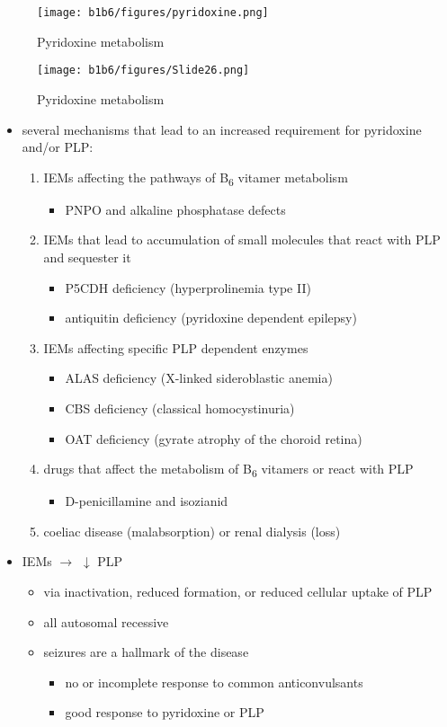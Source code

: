 \documentclass[12pt]{scrartcl}
\begin{document}
\begin{figure}[htbp]
\centering
\texttt{[image: b1b6/figures/pyridoxine.png]}
\caption{\label{fig:orgb8f4f33}Pyridoxine metabolism}
\end{figure}

\begin{figure}[htbp]
\centering
\texttt{[image: b1b6/figures/Slide26.png]}
\caption{\label{fig:org6278830}Pyridoxine metabolism}
\end{figure}

\begin{itemize}
\item several mechanisms that lead to an increased requirement for
pyridoxine and/or PLP:
\begin{enumerate}
\item IEMs affecting the pathways of B\textsubscript{6} vitamer metabolism
\begin{itemize}
\item PNPO and alkaline phosphatase defects
\end{itemize}
\item IEMs that lead to accumulation of small molecules that
react with PLP and sequester it
\begin{itemize}
\item P5CDH deficiency (hyperprolinemia type II)
\item antiquitin deficiency (pyridoxine dependent epilepsy)
\end{itemize}
\item IEMs affecting specific PLP dependent enzymes
\begin{itemize}
\item ALAS deficiency (X-linked sideroblastic anemia)
\item CBS deficiency (classical homocystinuria)
\item OAT deficiency (gyrate atrophy of the choroid retina)
\end{itemize}
\item drugs that affect the metabolism of B\textsubscript{6} vitamers or react with PLP
\begin{itemize}
\item D-penicillamine and isozianid
\end{itemize}
\item coeliac disease (malabsorption) or renal dialysis (loss)
\end{enumerate}
\item IEMs \(\to\) \(\downarrow\) PLP
\begin{itemize}
\item via inactivation, reduced formation, or reduced cellular uptake of
PLP
\item all autosomal recessive
\item seizures are a hallmark of the disease
\begin{itemize}
\item no or incomplete response to common anticonvulsants
\item good response to pyridoxine or PLP
\end{itemize}
\end{itemize}
\end{itemize}
\end{document}

